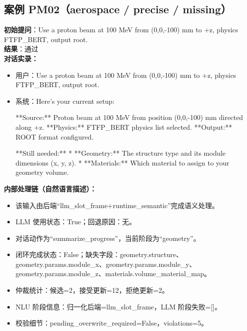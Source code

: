 \documentclass[11pt]{ctexart}
\begin{document}
\subsection{案例 PM02（aerospace / precise / missing）}
\textbf{初始提问}：Use a proton beam at 100 MeV from (0,0,-100) mm to +z, physics FTFP\_BERT, output root.\\
\textbf{结果}：通过\\
\textbf{对话实录：}
\begin{itemize}
\item 用户：Use a proton beam at 100 MeV from (0,0,-100) mm to +z, physics FTFP\_BERT, output root.
\item 系统：Here's your current setup:

**Source:** Proton beam at 100 MeV from position (0,0,-100) mm directed along +z.
**Physics:** FTFP\_BERT physics list selected.
**Output:** ROOT format configured.

**Still needed:**
*   **Geometry:** The structure type and its module dimensions (x, y, z).
*   **Materials:** Which material to assign to your geometry volume.
\end{itemize}
\textbf{内部处理链（自然语言描述）：}
\begin{itemize}
\item 该输入由后端“llm\_slot\_frame+runtime\_semantic”完成语义处理。
\item LLM 使用状态：True；回退原因：无。
\item 对话动作为“summarize\_progress”，当前阶段为“geometry”。
\item 闭环完成状态：False；缺失字段：geometry.structure、geometry.params.module\_x、geometry.params.module\_y、geometry.params.module\_z、materials.volume\_material\_map。
\item 仲裁统计：候选=2，接受更新=12，拒绝更新=2。
\item NLU 阶段信息：归一化后端=llm\_slot\_frame，LLM 阶段失败=[]。
\item 校验细节：pending\_overwrite\_required=False，violations=5。
\end{itemize}
\end{document}
